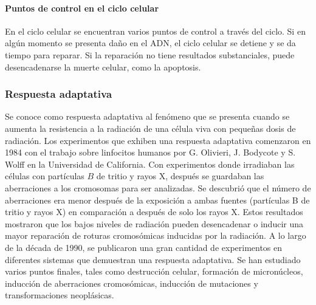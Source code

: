 \paragraph{Puntos de control en el ciclo celular}

En el ciclo celular se encuentran varios puntos de control a través del ciclo. Si en algún momento se presenta daño en el ADN, el ciclo celular se detiene y se da tiempo para reparar. Si la reparación no tiene resultados substanciales, puede desencadenarse la muerte celular, como la apoptosis.


\subsubsection{Respuesta adaptativa}
Se conoce como respuesta adaptativa al fenómeno que se presenta cuando se aumenta la resistencia a la radiación de una célula viva con pequeñas dosis de radiación.
Los experimentos que exhiben una respuesta adaptativa comenzaron en 1984 con el trabajo sobre linfocitos humanos por G. Olivieri, J. Bodycote y S. Wolff en la Universidad de California. Con experimentos donde irradiaban las células con partículas $B$ de tritio y rayos X, después se guardaban las aberraciones a los cromosomas para ser analizadas. Se descubrió que el número de aberraciones era menor después de la exposición a ambas fuentes (partículas B de tritio y rayos X) en comparación a después de solo los rayos X. Estos resultados mostraron que los bajos niveles de radiación pueden desencadenar o inducir una mayor reparación de roturas cromosómicas inducidas por la radiación.
A lo largo de la década de 1990, se publicaron una gran cantidad de experimentos en diferentes sistemas que demuestran una respuesta adaptativa. Se han estudiado varios puntos finales, tales como destrucción celular, formación de micronúcleos, inducción de aberraciones cromosómicas, inducción de mutaciones y transformaciones neoplásicas\cite{Thormod}.
